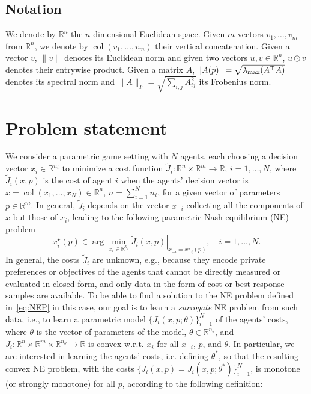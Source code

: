 \documentclass[11pt, a4paper]{article}
\newcommand{\rr}{\mathbb{R}}
\theoremstyle{remark}
\theoremstyle{plain}
\begin{document}
\subsection{Notation}
We denote by $\rr^n$ the $n$-dimensional Euclidean space.
Given $m$ vectors $v_1,\ldots,v_m$ from $\rr^n$, we denote by $\operatorname{col}(v_1,\ldots,v_m)$ their vertical concatenation. Given a vector $v$, $\|v\|$ denotes its Euclidean norm
and given two vectors $u,v\in\rr^n$, $u\odot v$ denotes their entrywise product.
Given a matrix $A$, $\|A(p)\|=\sqrt{\lambda_{\rm max}(A^\top A)}$ denotes its spectral norm and $\|A\|_F=\sqrt{\sum_{i,j}A_{ij}^2}$ its Frobenius norm.

\section{Problem statement}
\label{sec:problem-statement}
We consider a parametric game setting with $N$ agents, each choosing a decision vector $x_i\in\rr^{n_i}$ to minimize a cost function $\tilde J_i:\rr^n\times\rr^m\to\rr$, $i=1,\ldots,N$, where $\tilde J_i(x,p)$ is the cost of agent $i$ when the agents' decision vector is $x=\operatorname{col}(x_1,\ldots,x_N)\in\rr^n$, $n=\sum_{i=1}^N n_i$, for a given vector of parameters $p\in\rr^m$. In general, $\tilde J_i$ depends on the vector $x_{-i}$ collecting all the components of $x$ but those of $x_i$, leading to the following parametric Nash equilibrium (NE) problem
\begin{equation}
    x_i^\star(p) \in \arg\min_{x_i\in\rr^{n_i}} \left. \tilde J_i(x,p)\right|_{x_{-i}=x_{-i}^\star(p)},\quad i=1,\ldots,N.
\label{eq:NEP}
\end{equation}
In general, the costs $\tilde J_i$ are unknown, e.g., because they encode private preferences or objectives of the agents that cannot be directly measured or evaluated in closed form, and only data in the form of cost or best-response samples are available. To be able to find a solution to the NE problem defined in~\eqref{eq:NEP} in this case, our goal is to learn a {\it surrogate} NE problem from such data, i.e., to learn a parametric model $\{J_i(x,p;\theta)\}_{i=1}^N$ of the agents' costs, where $\theta$ is the vector of parameters of the model, $\theta\in\rr^{n_\theta}$,
and $J_i:\rr^n\times\rr^m\times\rr^{n_\theta}\to\rr$ is convex 
w.r.t. $x_i$ 
for all $x_{-i}$, $p$, and $\theta$. In particular, we are interested in learning the agents' costs, i.e. defining $\theta^*$, so that the resulting convex NE problem, with the costs $\{J_i(x,p) = J_i(x,p;\theta^*)\}_{i=1}^N$, is monotone (or strongly monotone) for all $p$, according to the following definition:
\end{document}
